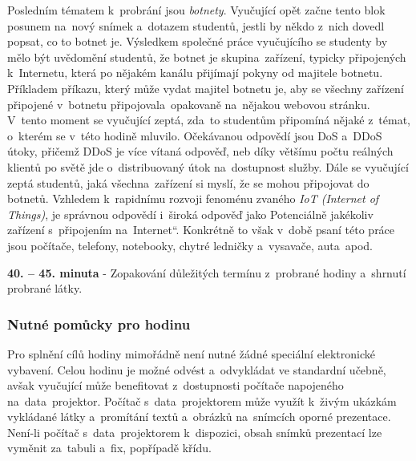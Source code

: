 \documentclass[a4paper, 12pt]{article}
\providecommand{\uv}[1]{\quotedblbase #1\textquotedblleft}
\begin{document}
Posledním tématem k~probrání jsou \textit{botnety}. Vyučující opět začne tento blok posunem na~nový snímek a~dotazem studentů, jestli by někdo z~nich dovedl popsat, co to botnet je. Výsledkem společné práce vyučujícího se studenty by mělo být uvědomění studentů, že botnet je skupina~zařízení, typicky připojených k~Internetu, která po nějakém kanálu přijímají pokyny od majitele botnetu. Příkladem příkazu, který může vydat majitel botnetu je, aby se všechny zařízení připojené v~botnetu připojovala~opakovaně na~nějakou webovou stránku. V~tento moment se vyučující zeptá, zda~to studentům připomíná nějaké z~témat, o~kterém se v~této hodině mluvilo. Očekávanou odpovědí jsou DoS a~DDoS útoky, přičemž DDoS je více vítaná odpověď, neb díky většímu počtu reálných klientů po světě jde o~distribuovaný útok na~dostupnost služby. Dále se vyučující zeptá studentů, jaká všechna~zařízení si myslí, že se mohou připojovat do botnetů. Vzhledem k~rapidnímu rozvoji fenoménu zvaného \textit{IoT (Internet of Things)}, je správnou odpovědí i~široká odpověď jako \uv{Potenciálně jakékoliv zařízení s~připojením na~Internet}. Konkrétně to však v~době psaní této práce jsou počítače, telefony, notebooky, chytré ledničky a~vysavače, auta~apod.

\textbf{40. -- 45. minuta} - Zopakování důležitých termínu z~probrané hodiny a~shrnutí probrané látky.

\subsubsection{Nutné pomůcky pro hodinu}
Pro splnění cílů hodiny mimořádně není nutné žádné speciální elektronické vybavení. Celou hodinu je možné odvést a~odvykládat ve standardní učebně, avšak vyučující může benefitovat z~dostupnosti počítače napojeného na~data~projektor. Počítač s~data~projektorem může využít k~živým ukázkám vykládané látky a~promítání textů a~obrázků na~snímcích oporné prezentace. Není-li počítač s~data~projektorem k~dispozici, obsah snímků prezentací lze vyměnit za~tabuli a~fix, popřípadě křídu.
\end{document}

